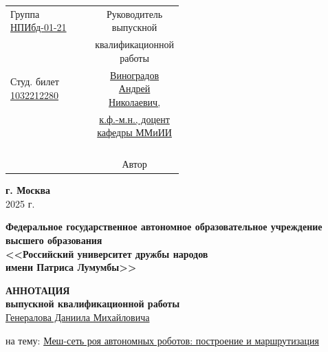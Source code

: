 \documentclass[%
]{report}
\begin{document}
\begin{titlepage}
  \vspace*{\fill}

  \noindent\begin{tabular}{p{0.5\linewidth} c}
Группа \uline{НПИбд-01-21} & Руководитель выпускной  \\
      & квалификационной работы\\
      Студ. билет \textnumero{} \underline{1032212280} & \uline{Виноградов Андрей Николаевич,}\\
      & \uline{к.ф.-м.н., доцент кафедры ММиИИ} \\
      \\
      & \underline{\phantom{signature signature signature sig}} \\
      \\
      \\
      & Автор \underline{\phantom{signature signature signat}} \\
    \end{tabular}
   \vspace*{\fill}
   
  \begin{center} \textbf{г. Москва} \\ 2025 г. \end{center}
  \thispagestyle{empty} %
   
  \end{titlepage}
  \restoregeometry
   \newpage


\begin{center}
  \textbf{Федеральное государственное автономное образовательное учреждение высшего образования} \\
  \textbf{<<Российский университет дружбы народов}\\
  \textbf{имени Патриса Лумумбы>>}\\

  \vspace*{\fill}

  \large \textbf{АННОТАЦИЯ}\\
  \normalsize \textbf{выпускной квалификационной работы} \\

  \uline{Генералова Даниила Михайловича}
\end{center}

\noindent на тему: \uline{Меш-сеть роя автономных роботов: построение и маршрутизация}
\end{document}
